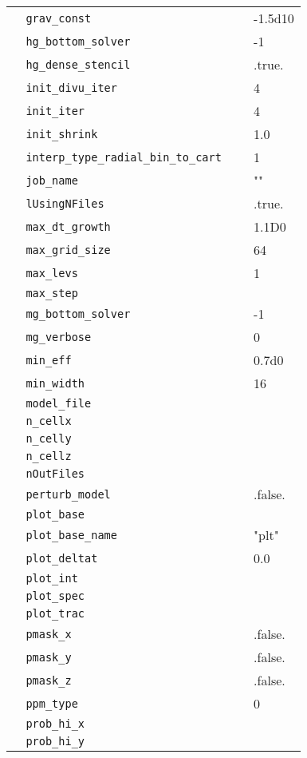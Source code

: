 {\begin{center}
\begin{longtable}{|l|p{3.25in}|l|}
\verb=  grav_const =  &   &  -1.5d10 \\
\verb=  hg_bottom_solver =  &   &  -1 \\
\verb=  hg_dense_stencil =  &   &  .true. \\
\verb=  init_divu_iter =  &   &  4 \\
\verb=  init_iter =  &   &  4 \\
\verb=  init_shrink =  &   &  1.0 \\
\verb=  interp_type_radial_bin_to_cart =  &   &  1 \\
\verb=  job_name =  &   &  "" \\
\verb=  lUsingNFiles =  &   &  .true. \\
\verb=  max_dt_growth =  &   &  1.1D0 \\
\verb=  max_grid_size =  &   &  64 \\
\verb=  max_levs =  &   &  1 \\
\verb=  max_step =  &   &  \\
\verb=  mg_bottom_solver =  &   &  -1 \\
\verb=  mg_verbose =  &   &  0 \\
\verb=  min_eff =  &   &  0.7d0 \\
\verb=  min_width =  &   &  16 \\
\verb=  model_file =  &   &  \\
\verb=  n_cellx =  &   &  \\
\verb=  n_celly =  &   &  \\
\verb=  n_cellz =  &   &  \\
\verb=  nOutFiles =  &   &  \\
\verb=  perturb_model =  &   &  .false. \\
\verb=  plot_base =  &   &  \\
\verb=  plot_base_name =  &   &  "plt" \\
\verb=  plot_deltat =  &   &  0.0 \\
\verb=  plot_int =  &   &  \\
\verb=  plot_spec =  &   &  \\
\verb=  plot_trac =  &   &  \\
\verb=  pmask_x =  &   &  .false. \\
\verb=  pmask_y =  &   &  .false. \\
\verb=  pmask_z =  &   &  .false. \\
\verb=  ppm_type =  &   &  0 \\
\verb=  prob_hi_x =  &   &  \\
\verb=  prob_hi_y =  &   &  \\

\end{longtable}
\end{center}}
